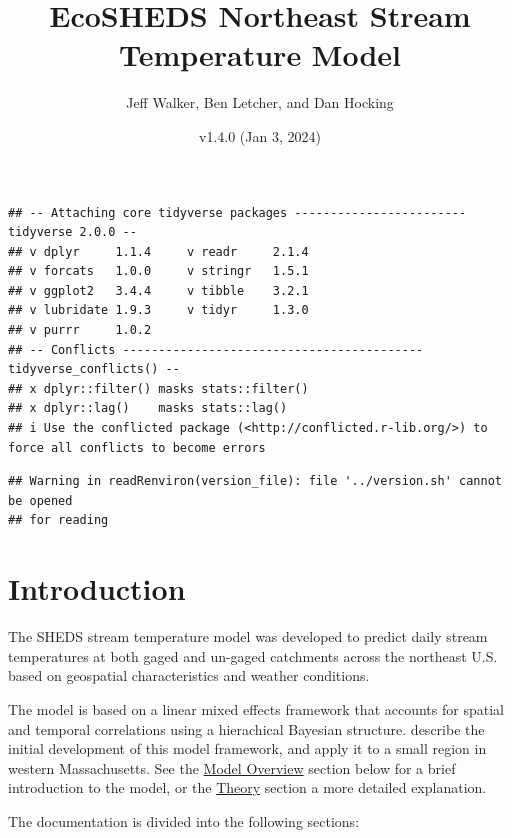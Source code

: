 \documentclass[
]{book}
\title{EcoSHEDS Northeast Stream Temperature Model}
\author{Jeff Walker, Ben Letcher, and Dan Hocking}
\date{v1.4.0 (Jan 3, 2024)}
\begin{document}
\maketitle

{
\setcounter{tocdepth}{1}
\tableofcontents
}
\begin{verbatim}
## -- Attaching core tidyverse packages ------------------------ tidyverse 2.0.0 --
## v dplyr     1.1.4     v readr     2.1.4
## v forcats   1.0.0     v stringr   1.5.1
## v ggplot2   3.4.4     v tibble    3.2.1
## v lubridate 1.9.3     v tidyr     1.3.0
## v purrr     1.0.2     
## -- Conflicts ------------------------------------------ tidyverse_conflicts() --
## x dplyr::filter() masks stats::filter()
## x dplyr::lag()    masks stats::lag()
## i Use the conflicted package (<http://conflicted.r-lib.org/>) to force all conflicts to become errors
\end{verbatim}

\begin{verbatim}
## Warning in readRenviron(version_file): file '../version.sh' cannot be opened
## for reading
\end{verbatim}

\chapter{Introduction}\label{intro}

The SHEDS stream temperature model was developed to predict daily stream temperatures at both gaged and un-gaged catchments across the northeast U.S. based on geospatial characteristics and weather conditions.

The model is based on a linear mixed effects framework that accounts for spatial and temporal correlations using a hierachical Bayesian structure. \citet{Letcher2016} describe the initial development of this model framework, and apply it to a small region in western Massachusetts. See the \hyperref[model-overview]{Model Overview} section below for a brief introduction to the model, or the \hyperref[theory]{Theory} section a more detailed explanation.

The documentation is divided into the following sections:
\end{document}
